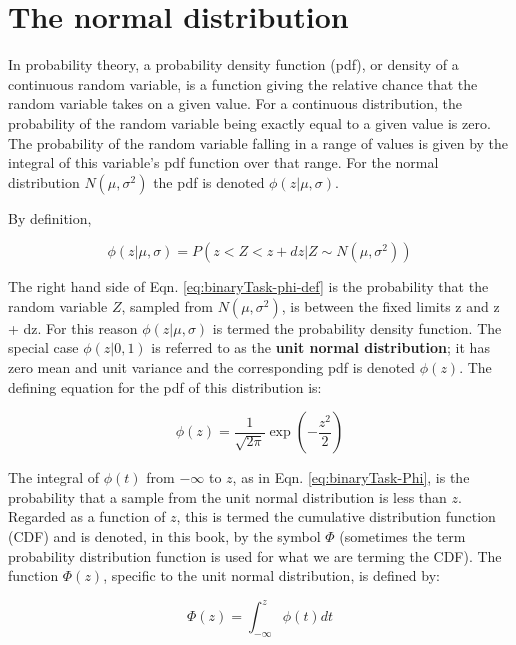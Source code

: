 \documentclass[
]{book}
\begin{document}
\hypertarget{the-normal-distribution}{%
\section{The normal distribution}\label{the-normal-distribution}}

In probability theory, a probability density function (pdf), or density of a continuous random variable, is a function giving the relative chance that the random variable takes on a given value. For a continuous distribution, the probability of the random variable being exactly equal to a given value is zero. The probability of the random variable falling in a range of values is given by the integral of this variable's pdf function over that range. For the normal distribution \(N(\mu,\sigma^2)\) the pdf is denoted \(\phi(z|\mu,\sigma)\).

By definition,

\begin{equation} 
\phi\left ( z|\mu,\sigma \right )=P(z<Z<z+dz|Z \sim N(\mu,\sigma^2))
\label{eq:binaryTask-phi-def}
\end{equation}

The right hand side of Eqn. \eqref{eq:binaryTask-phi-def} is the probability that the random variable \(Z\), sampled from \(N(\mu,\sigma^2)\), is between the fixed limits z and z + dz. For this reason \(\phi(z|\mu,\sigma)\) is termed the probability density function. The special case \(\phi(z|0,1)\) is referred to as the \textbf{unit normal distribution}; it has zero mean and unit variance and the corresponding pdf is denoted \(\phi(z)\). The defining equation for the pdf of this distribution is:

\begin{equation} 
\phi\left ( z \right )=\frac{1}{\sqrt{2\pi}}\exp\left ( -\frac{z^2}{2} \right )
\label{eq:binaryTask-phi}
\end{equation}

The integral of \(\phi(t)\) from \(-\infty\) to \(z\), as in Eqn. \eqref{eq:binaryTask-Phi}, is the probability that a sample from the unit normal distribution is less than \(z\). Regarded as a function of \(z\), this is termed the cumulative distribution function (CDF) and is denoted, in this book, by the symbol \(\Phi\) (sometimes the term probability distribution function is used for what we are terming the CDF). The function \(\Phi(z)\), specific to the unit normal distribution, is defined by:

\begin{equation} 
\Phi\left ( z \right )=\int_{-\infty }^{z}\phi(t)dt
\label{eq:binaryTask-Phi}
\end{equation}
\end{document}
